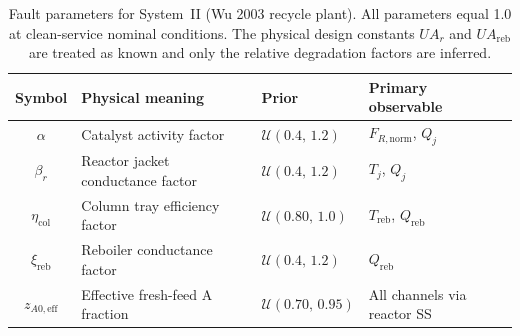\documentclass[aps,pre,twocolumn,superscriptaddress]{revtex4-2}
\begin{document}
\begin{table}[htbp]
\centering
\caption{Fault parameters for System~II (Wu 2003 recycle plant). All parameters
  equal 1.0 at clean-service nominal conditions. The physical design constants
  $U\!A_r$ and $U\!A_\mathrm{reb}$ are treated as known and only the relative
  degradation factors are inferred.}
\label{tab:wu_fault_params}
\small
\begin{tabular}{clll}
\toprule
Symbol & Physical meaning & Prior & Primary observable \\  
\midrule
$\alpha$ & Catalyst activity factor & $\mathcal{U}(0.4,\,1.2)$ & $F_{R,\mathrm{norm}}$, $Q_j$ \\
$\beta_r$ & Reactor jacket conductance factor & $\mathcal{U}(0.4,\,1.2)$ & $T_j$, $Q_j$ \\
$\eta_\mathrm{col}$ & Column tray efficiency factor & $\mathcal{U}(0.80,\,1.0)$ & $T_\mathrm{reb}$, $Q_\mathrm{reb}$ \\
$\xi_\mathrm{reb}$ & Reboiler conductance factor & $\mathcal{U}(0.4,\,1.2)$ & $Q_\mathrm{reb}$ \\
$z_{A0,\mathrm{eff}}$ & Effective fresh-feed A fraction & $\mathcal{U}(0.70,\,0.95)$ & All channels via reactor SS \\
\bottomrule
\end{tabular}
\end{table}
\end{document}
